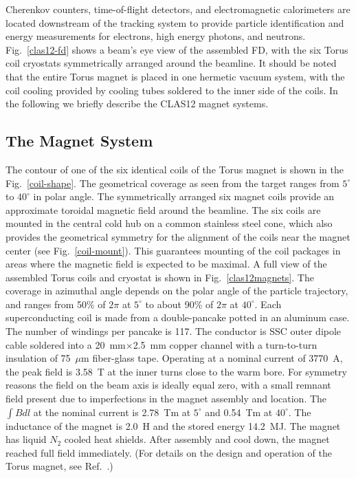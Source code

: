 \documentclass[final,3p,times,twocolumn,authoryear]{elsarticle}
\begin{document}
Cherenkov counters, time-of-flight detectors,  and electromagnetic calorimeters are located  downstream of the tracking
system to provide particle identification and energy measurements for electrons, high energy photons, and neutrons.
Fig.~\ref{clas12-fd} shows a beam's eye view of the assembled FD, with the six Torus coil cryostats symmetrically
arranged around the beamline. It should be noted that the entire Torus magnet is placed in one hermetic vacuum system,
with the coil cooling provided by cooling tubes soldered to the inner side of the coils.  In the following we briefly describe
the CLAS12 magnet systems. 

\subsection{The Magnet System}
\label{torus}

The contour of one of the six identical coils of the Torus magnet is shown in the  Fig.~\ref{coil-shape}. The geometrical
coverage as seen from the target ranges from $5^\circ$ to $40^\circ$ in polar angle. The symmetrically arranged six
magnet coils provide an approximate toroidal magnetic field around the beamline. The six coils are mounted in the central
cold hub on a common stainless steel cone, which also provides the geometrical symmetry for the alignment of the coils near
the magnet center (see Fig.~\ref{coil-mount}). This guarantees mounting of the coil packages in areas where the magnetic
field is expected to be maximal. A full view of the assembled Torus coils and cryostat is shown in Fig.~\ref{clas12magnets}.
The coverage in azimuthal angle depends on the polar angle of the particle trajectory, and ranges from 50\% of $2\pi$ at
$5^\circ$ to about 90\% of $2\pi$ at $40^\circ$. Each superconducting coil is made from a double-pancake potted in an
aluminum case. The number of windings per pancake is 117. The conductor is SSC outer dipole cable soldered into a
20~mm$\times$2.5~mm copper channel with a turn-to-turn insulation of 75~$\mu$m fiber-glass tape. Operating at a nominal
current of 3770~A, the peak field is 3.58~T at the inner turns close to the warm bore. For symmetry reasons the field on the
beam axis is ideally equal zero, with a small remnant field present due to imperfections in the magnet assembly and location.
The $\int {Bdl}$ at the nominal current is 2.78~Tm at $5^\circ$ and 0.54~Tm at $40^\circ$. The inductance of the magnet is
2.0~H and the stored energy 14.2~MJ. The magnet has liquid $N_2$ cooled heat shields. After assembly and cool down, the
magnet reached full field immediately.  (For details on the design and operation of the Torus magnet, see
Ref.~\cite{clas12-magnets}.)
\end{document}
